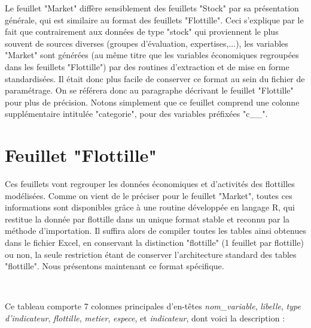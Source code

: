 \documentclass[12pt, colorinlistoftodos, notitlepage]{report}
\newenvironment{not used}[1]{%
    \longtable{%
        |>{\centering$\displaystyle}A{#1}{1}<{$}%
        |}\hline\ignorespaces}{%
    \endlongtable\ignorespacesafterend}
\begin{document}
Le feuillet "Market" diffère sensiblement des feuillets "Stock" par sa présentation générale, qui est similaire au format des feuillets "Flottille". Ceci s'explique par le fait que contrairement aux données de type "stock" qui proviennent le plus souvent de sources diverses (groupes d'évaluation, expertises,...), les variables "Market" sont générées (au même titre que les variables économiques regroupées dans les feuillets "Flottille") par des routines d'extraction et de mise en forme standardisées. Il était donc plus facile de conserver ce format au sein du fichier de paramétrage. On se référera donc au paragraphe décrivant le feuillet "Flottille" pour plus de précision. Notons simplement que ce feuillet comprend une colonne supplémentaire intitulée "categorie", pour des variables préfixées "c\_\_".


\section{Feuillet "Flottille"}

Ces feuillets vont regrouper les données économiques et d'activités des flottilles modélisées. Comme on vient de le préciser pour le feuillet "Market", toutes ces informations sont disponibles grâce à une routine développée en langage R, qui restitue la donnée par flottille dans un unique format stable et reconnu par la méthode d'importation. Il suffira alors de compiler toutes les tables ainsi obtenues dans le fichier Excel, en conservant la distinction "flottille" (1 feuillet par flottille) ou non, la seule restriction étant de conserver l'architecture standard des tables "flottille". Nous présentons maintenant ce format spécifique.

\par~\par

Ce tableau comporte 7 colonnes principales d'en-têtes \textit{nom\_variable}, \textit{libelle}, \textit{type d'indicateur}, \textit{flottille}, \textit{metier}, \textit{espece}, et \textit{indicateur}, dont voici la description :
\end{document}
